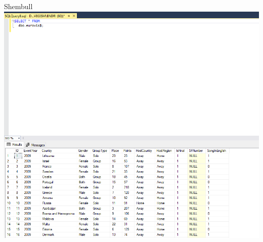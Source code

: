 \documentclass[
  ignorenonframetext,
]{beamer}
\begin{document}
\begin{frame}{Shembull}
\label{shembull-7}
\includegraphics{./Figs/query5.png}
\end{frame}
\end{document}

